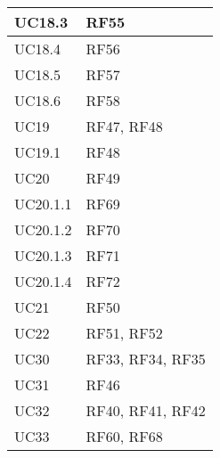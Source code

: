\begin{center}
\begin{longtable}{|C{5cm}|C{5cm}|}
    \hline
    UC18.3 & RF55 \\
    \hline
    UC18.4 & RF56 \\
    \hline
    UC18.5 & RF57 \\
    \hline
    UC18.6 & RF58 \\
    \hline
    UC19 & RF47, RF48 \\
    \hline
    UC19.1 & RF48 \\
    \hline
    UC20 & RF49 \\
    \hline
    UC20.1.1 & RF69 \\
    \hline
    UC20.1.2 & RF70 \\
    \hline
    UC20.1.3 & RF71 \\
    \hline
    UC20.1.4 & RF72 \\
    \hline
    UC21 & RF50 \\
    \hline
    UC22 & RF51, RF52 \\
    \hline
    UC30 & RF33, RF34, RF35 \\
    \hline
    UC31 & RF46 \\
    \hline
    UC32 & RF40, RF41, RF42 \\
    \hline
    UC33 & RF60, RF68 \\
    \hline
\end{longtable}
\end{center}
